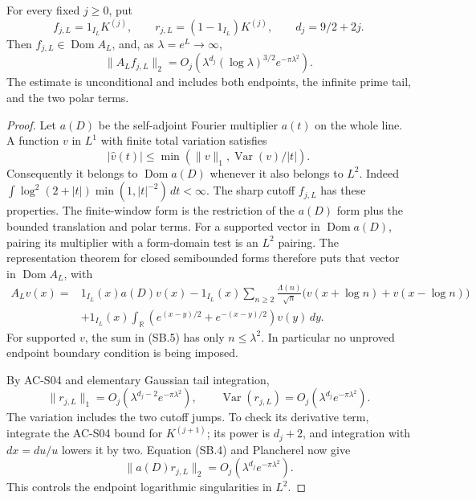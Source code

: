 \begin{theorem}
\label{AC-S23}
For every fixed \(j\geq0\), put
\[
 f_{j,L}=1_{I_L}K^{(j)},\qquad
 r_{j,L}=(1-1_{I_L})K^{(j)},\qquad d_j=9/2+2j.
\]
Then \(f_{j,L}\in\operatorname{Dom}A_L\), and, as
\(\lambda=e^L\to\infty\),
\[
 \|A_Lf_{j,L}\|_2
     =O_j\!\left(\lambda^{d_j}(\log\lambda)^{3/2}
                              e^{-\pi\lambda^2}\right).         \tag{SB.3}
\]
The estimate is unconditional and includes both endpoints, the
infinite prime tail, and the two polar terms.
\end{theorem}
\begin{proof}
Let \(a(D)\) be the self-adjoint Fourier multiplier \(a(t)\) on the
whole line.  A function \(v\) in \(L^1\) with finite total variation
satisfies
\[
 |\widehat v(t)|\leq
       \min(\|v\|_1,\operatorname{Var}(v)/|t|).
                                                               \tag{SB.4}
\]
Consequently it belongs to \(\operatorname{Dom}a(D)\) whenever it
also belongs to \(L^2\).  Indeed
\(\int\log^2(2+|t|)\min(1,|t|^{-2})\,dt<\infty\).
The sharp cutoff \(f_{j,L}\) has these properties.  The finite-window
form is the restriction of the \(a(D)\) form plus the bounded
translation and polar terms.  For a supported vector in
\(\operatorname{Dom}a(D)\), pairing its multiplier with a form-domain
test is an \(L^2\) pairing.  The representation theorem for closed
semibounded forms therefore puts that vector in
\(\operatorname{Dom}A_L\), with
\[
\begin{split}
 A_Lv(x)={}&1_{I_L}(x)a(D)v(x)
 -1_{I_L}(x)\sum_{n\geq2}\frac{\Lambda(n)}{\sqrt n}
                    \bigl(v(x+\log n)+v(x-\log n)\bigr)\\
 &+1_{I_L}(x)\int_{\mathbb R}
       (e^{(x-y)/2}+e^{-(x-y)/2})v(y)\,dy .
\end{split}                                                    \tag{SB.5}
\]
For supported \(v\), the sum in (SB.5) has only \(n\leq\lambda^2\).
In particular no unproved endpoint boundary condition is being imposed.

By AC-S04 and elementary Gaussian tail integration,
\[
 \|r_{j,L}\|_1=O_j(\lambda^{d_j-2}e^{-\pi\lambda^2}),
 \qquad
 \operatorname{Var}(r_{j,L})
       =O_j(\lambda^{d_j}e^{-\pi\lambda^2}).                   \tag{SB.6}
\]
The variation includes the two cutoff jumps.  To check its derivative
term, integrate the AC-S04 bound for \(K^{(j+1)}\); its power is
\(d_j+2\), and integration with \(dx=du/u\) lowers it by two.
Equation (SB.4) and Plancherel now give
\[
 \|a(D)r_{j,L}\|_2
       =O_j(\lambda^{d_j}e^{-\pi\lambda^2}).                   \tag{SB.7}
\]
This controls the endpoint logarithmic singularities in \(L^2\).


\end{proof}
